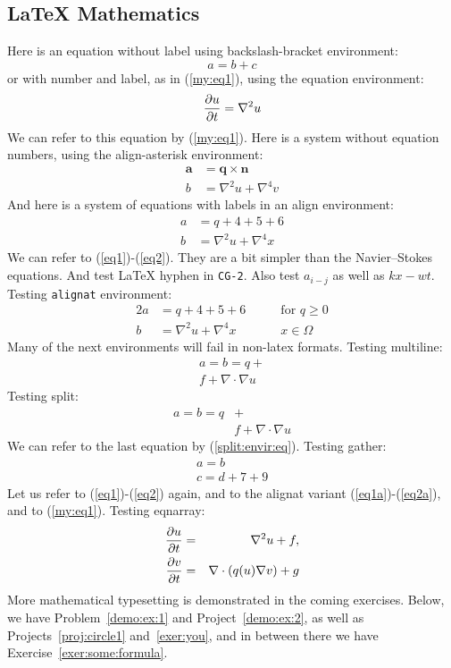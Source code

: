 \documentclass[%
oneside,                 %
final,                   %
10pt]{article}
\theoremstyle{definition}
\begin{document}
\begin{enumerate}
\subsection{{\LaTeX} Mathematics}
Here is an equation without label using backslash-bracket environment:
\[ a = b + c \]
or with number and label, as in (\ref{my:eq1}), using the equation environment:
\begin{equation}
{\partial u\over\partial t} = \nabla^2 u \label{my:eq1}
\end{equation}
We can refer to this equation by (\ref{my:eq1}).
Here is a system without equation numbers, using the align-asterisk environment:
\begin{align*}
\pmb{a} &= \pmb{q}\times\pmb{n} \\ 
b &= \nabla^2 u + \nabla^4 v
\end{align*}
And here is a system of equations with labels in an align environment:
\begin{align}
a &= q + 4 + 5+ 6 \label{eq1} \\ 
b &= \nabla^2 u + \nabla^4 x \label{eq2}
\end{align}
We can refer to (\ref{eq1})-(\ref{eq2}). They are a bit simpler than
the Navier--Stokes equations. And test {\LaTeX} hyphen in \texttt{CG-2}.
Also test $a_{i-j}$ as well as $kx-wt$.
Testing \texttt{alignat} environment:
\begin{alignat}{2}
a &= q + 4 + 5+ 6\qquad & \mbox{for } q\geq 0 \label{eq1a} \\ 
b &= \nabla^2 u + \nabla^4 x & x\in\Omega \label{eq2a}
\end{alignat}
Many of the next environments will fail in non-latex formats.
Testing multiline:
\begin{multline}
a = b = q + \\ 
  f + \nabla\cdot\nabla u
\label{multiline:eq1}
\end{multline}
Testing split:
\begin{equation}
\label{split:envir:eq}
\begin{split}
a = b = q &+ \\ 
  & f + \nabla\cdot\nabla u
\end{split}
\end{equation}
We can refer to the last equation by (\ref{split:envir:eq}).
Testing gather:
\begin{gather}
a = b \\ 
c = d + 7 + 9
\end{gather}
Let us refer to (\ref{eq1})-(\ref{eq2}) again, and to the
alignat variant (\ref{eq1a})-(\ref{eq2a}), and to (\ref{my:eq1}).
Testing eqnarray:
\begin{eqnarray}
{\partial u\over\partial t} &=& \nabla^2 u + f, \label{myeq1}\\ 
{\partial v\over\partial t} &=& \nabla\cdot(q(u)\nabla v) + g \label{myeq2}
\end{eqnarray}
More mathematical typesetting is demonstrated in the coming exercises.
Below, we have Problem~\vref{demo:ex:1} and Project~\vref{demo:ex:2},
as well as Projects~\vref{proj:circle1} and~\vref{exer:you}, and in
between there we have Exercise~\vref{exer:some:formula}.

\end{enumerate}
\end{document}
